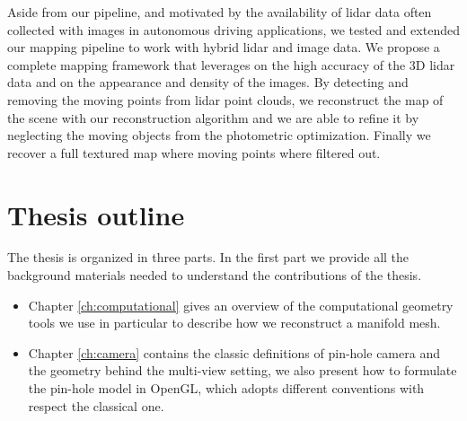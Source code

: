 Aside from our pipeline, and motivated by the availability of lidar data often collected  with images in autonomous driving applications, we tested and extended our mapping pipeline to work with hybrid lidar and image data.
We propose a complete mapping framework  that leverages on the high accuracy of the 3D lidar data and on the appearance and density of the images.
By detecting and removing the moving points from lidar point clouds, we reconstruct the map of the scene with our reconstruction algorithm and we are able to refine it by neglecting the moving objects from the photometric optimization. Finally we recover a full textured map where moving points where filtered out.


\section{Thesis outline}

The thesis is organized in three parts. 
In the first part we provide all the background materials needed to understand the contributions of the thesis.
\begin{itemize}
 \item Chapter \ref{ch:computational} gives an overview of the computational geometry tools we use in particular to describe how we reconstruct a manifold mesh.
 \item Chapter \ref{ch:camera} contains the classic definitions of pin-hole camera and the geometry behind the  multi-view setting, we also present how to formulate the pin-hole model in OpenGL, which adopts different conventions with respect the classical one.
\end{itemize}




